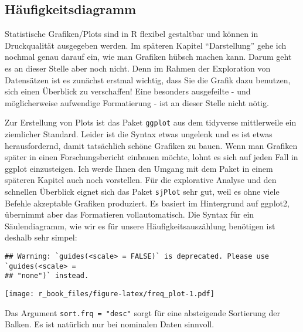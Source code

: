 \documentclass[
]{book}
\newenvironment{Shaded}{\begin{snugshade}}{\end{snugshade}}
\newcommand{\AttributeTok}[1]{\textcolor[rgb]{0.77,0.63,0.00}{#1}}
\newcommand{\FunctionTok}[1]{\textcolor[rgb]{0.00,0.00,0.00}{#1}}
\newcommand{\NormalTok}[1]{#1}
\newcommand{\SpecialCharTok}[1]{\textcolor[rgb]{0.00,0.00,0.00}{#1}}
\newcommand{\StringTok}[1]{\textcolor[rgb]{0.31,0.60,0.02}{#1}}
\begin{document}
\hypertarget{huxe4ufigkeitsdiagramm}{%
\subsection{Häufigkeitsdiagramm}\label{huxe4ufigkeitsdiagramm}}

Statistische Grafiken/Plots sind in R flexibel gestaltbar und können in Druckqualität ausgegeben werden. Im späteren Kapitel ``Darstellung'' gehe ich nochmal genau darauf ein, wie man Grafiken hübsch machen kann. Darum geht es an dieser Stelle aber noch nicht. Denn im Rahmen der Exploration von Datensätzen ist es zunächst erstmal wichtig, dass Sie die Grafik dazu benutzen, sich einen Überblick zu verschaffen! Eine besonders ausgefeilte - und möglicherweise aufwendige Formatierung - ist an dieser Stelle nicht nötig.

Zur Erstellung von Plots ist das Paket \texttt{ggplot} aus dem tidyverse mittlerweile ein ziemlicher Standard. Leider ist die Syntax etwas ungelenk und es ist etwas herausfordernd, damit tatsächlich schöne Grafiken zu bauen. Wenn man Grafiken später in einen Forschungsbericht einbauen möchte, lohnt es sich auf jeden Fall in ggplot einzusteigen. Ich werde Ihnen den Umgang mit dem Paket in einem späteren Kapitel auch noch vorstellen. Für die explorative Analyse und den schnellen Überblick eignet sich das Paket \texttt{sjPlot} sehr gut, weil es ohne viele Befehle akzeptable Grafiken produziert. Es basiert im Hintergrund auf ggplot2, übernimmt aber das Formatieren vollautomatisch. Die Syntax für ein Säulendiagramm, wie wir es für unsere Häufigkeitsauszählung benötigen ist deshalb sehr simpel:

\begin{Shaded}
\end{Shaded}

\begin{verbatim}
## Warning: `guides(<scale> = FALSE)` is deprecated. Please use `guides(<scale> =
## "none")` instead.
\end{verbatim}

\texttt{[image: r\_book\_files/figure-latex/freq\_plot-1.pdf]}

Das Argument \texttt{sort.frq\ =\ "desc"} sorgt für eine absteigende Sortierung der Balken. Es ist natürlich nur bei nominalen Daten sinnvoll.
\end{document}
